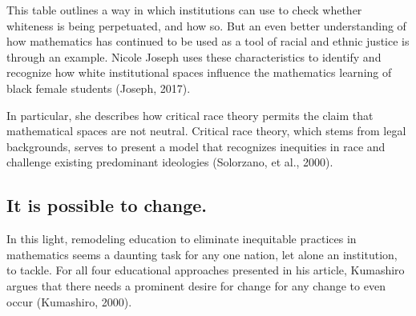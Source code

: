This table outlines a way in which institutions can use to check whether whiteness is being perpetuated, and how so. But an even better understanding of how mathematics has continued to be used as a tool of racial and ethnic justice is through an example. Nicole Joseph uses these characteristics to identify and recognize how white institutional spaces influence the mathematics learning of black female students (Joseph, 2017).

In particular, she describes how critical race theory permits the claim that mathematical spaces are not neutral. Critical race theory, which stems from legal backgrounds, serves to present a model that recognizes inequities in race and challenge existing predominant ideologies (Solorzano, et al., 2000).

\subsection{It is possible to change.}
In this light, remodeling education to eliminate inequitable practices in mathematics seems a daunting task for any one nation, let alone an institution, to tackle. For all four educational approaches presented in his article, Kumashiro argues that there needs a prominent desire for change for any change to even occur (Kumashiro, 2000).
